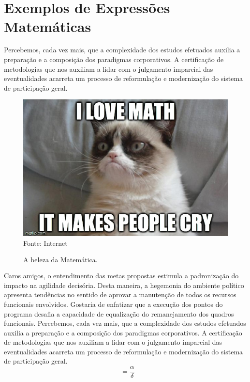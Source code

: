 \documentclass[fleqn]{profmat-cefet}
\DeclareMathOperator{\angulo}{\hat{a}ngulo}
\begin{document}
\chapter{Exemplos de Expressões Matemáticas}
\label{cap:exemplos_de_expressoes_matematicas}

Percebemos, cada vez mais, que a complexidade dos estudos efetuados
auxilia a preparação e a composição dos paradigmas corporativos. A certificação
de metodologias que nos auxiliam a lidar com o julgamento imparcial das
eventualidades acarreta um processo de reformulação e modernização do sistema de
participação geral. 

\begin{figure}
    \centering
    \caption{A beleza da Matemática.}
    \label{fig:latexpet}
    \includegraphics[width=\linewidth]{figs/bad-cat}
    \\ Fonte: Internet
\end{figure}

Caros amigos, o entendimento das metas propostas estimula a padronização do
impacto na agilidade decisória. Desta maneira, a hegemonia do ambiente político
apresenta tendências no sentido de aprovar a manutenção de todos os recursos
funcionais envolvidos. Gostaria de enfatizar que a execução dos pontos do
programa desafia a capacidade de equalização do remanejamento dos quadros
funcionais. Percebemos, cada vez mais, que a complexidade dos estudos efetuados
auxilia a preparação e a composição dos paradigmas corporativos. A certificação
de metodologias que nos auxiliam a lidar com o julgamento imparcial das
eventualidades acarreta um processo de reformulação e modernização do sistema de
participação geral. 
\[ \angulo = \frac{\alpha}{\delta} \]
\end{document}
